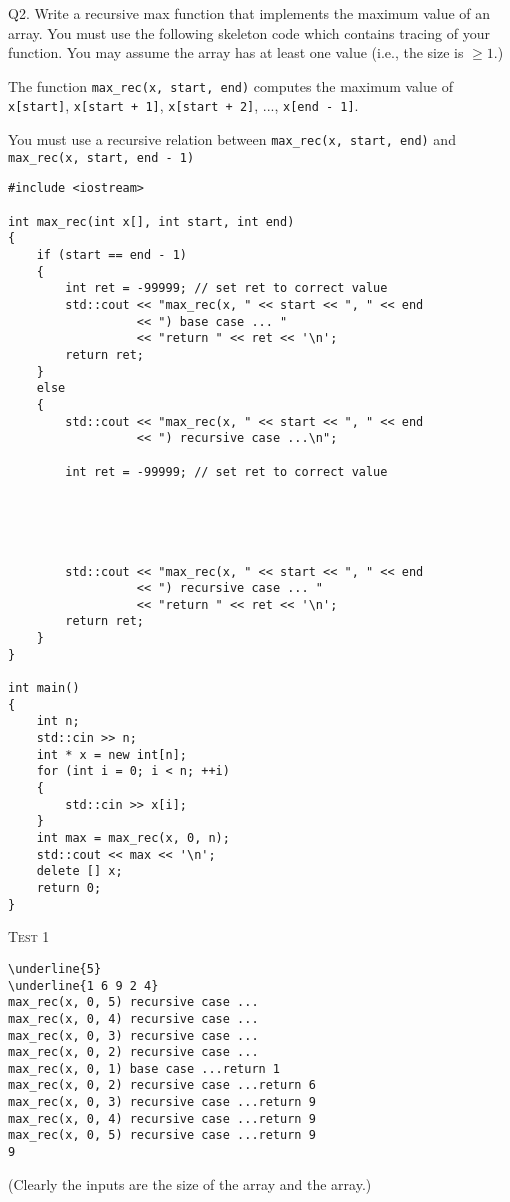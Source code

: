 Q2.
Write a recursive max function that implements
the maximum value of an array.
You must use the following skeleton code which
contains tracing of your function.
You may assume the array has at least one value (i.e., the size is $\geq 1$.)

The function
\verb!max_rec(x, start, end)!
computes the maximum value of
\verb!x[start]!, 
\verb!x[start + 1]!, 
\verb!x[start + 2]!, ...,
\verb!x[end - 1]!.

You must use a recursive relation between
\verb!max_rec(x, start, end)!
and
\\
\verb!max_rec(x, start, end - 1)!

\begin{Verbatim}[frame=single, fontsize=\small]
#include <iostream>

int max_rec(int x[], int start, int end)
{
    if (start == end - 1)
    {
        int ret = -99999; // set ret to correct value
        std::cout << "max_rec(x, " << start << ", " << end
                  << ") base case ... "
                  << "return " << ret << '\n';
        return ret;
    }
    else
    {
        std::cout << "max_rec(x, " << start << ", " << end
                  << ") recursive case ...\n";

        int ret = -99999; // set ret to correct value





        std::cout << "max_rec(x, " << start << ", " << end 
                  << ") recursive case ... "
                  << "return " << ret << '\n';
        return ret;        
    }
}

int main()
{
    int n;
    std::cin >> n;
    int * x = new int[n];
    for (int i = 0; i < n; ++i)
    {
        std::cin >> x[i];
    }
    int max = max_rec(x, 0, n);
    std::cout << max << '\n';
    delete [] x;
    return 0;
}
\end{Verbatim}

\textsc{Test 1}
\begin{Verbatim}[commandchars=\\\{\}, fontsize=\small, frame=single]
\underline{5}
\underline{1 6 9 2 4}
max_rec(x, 0, 5) recursive case ...
max_rec(x, 0, 4) recursive case ...
max_rec(x, 0, 3) recursive case ...
max_rec(x, 0, 2) recursive case ...
max_rec(x, 0, 1) base case ...return 1
max_rec(x, 0, 2) recursive case ...return 6
max_rec(x, 0, 3) recursive case ...return 9
max_rec(x, 0, 4) recursive case ...return 9
max_rec(x, 0, 5) recursive case ...return 9
9
\end{Verbatim}
(Clearly the inputs are the size of the array and the array.)

